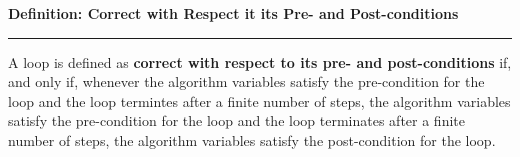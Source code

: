 \nopagenumbers
{\bf Definition: Correct with Respect it its Pre- and Post-conditions}
\vskip 1mm
\hrule

\vskip 6pt
A loop is defined as {\bf correct with respect to its pre- and post-conditions} if, and only if, whenever the algorithm variables satisfy the pre-condition for the loop and the loop termintes after a finite number of steps, the algorithm variables satisfy the pre-condition for the loop and the loop terminates after a finite number of steps, the algorithm variables satisfy the post-condition for the loop.

\vfill\eject
